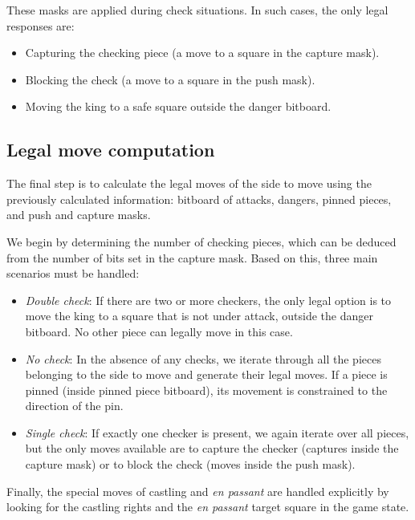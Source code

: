 \noindent These masks are applied during check situations. In such cases, the only legal responses are:

\begin{itemize}[itemsep=1pt]
    \item Capturing the checking piece (a move to a square in the capture mask).
    \item Blocking the check (a move to a square in the push mask).
    \item Moving the king to a safe square outside the danger bitboard.
\end{itemize}

\subsection*{Legal move computation}

\noindent The final step is to calculate the legal moves of the side to move using the previously calculated information: bitboard of attacks, dangers, pinned pieces, and push and capture masks.

\vspace{1em}

\noindent We begin by determining the number of checking pieces, which can be deduced from the number of bits set in the capture mask. Based on this, three main scenarios must be handled:

\begin{itemize}[itemsep=1pt]
    \item \textit{Double check}: If there are two or more checkers, the only legal option is to move the king to a square that is not under attack, outside the danger bitboard. No other piece can legally move in this case.
    \item \textit{No check}: In the absence of any checks, we iterate through all the pieces belonging to the side to move and generate their legal moves. If a piece is pinned (inside pinned piece bitboard), its movement is constrained to the direction of the pin.
    \item \textit{Single check}: If exactly one checker is present, we again iterate over all pieces, but the only moves available are to capture the checker (captures inside the capture mask) or to block the check (moves inside the push mask).
\end{itemize}

\noindent Finally, the special moves of castling and \textit{en passant} are handled explicitly by looking for the castling rights and the \textit{en passant} target square in the game state.

